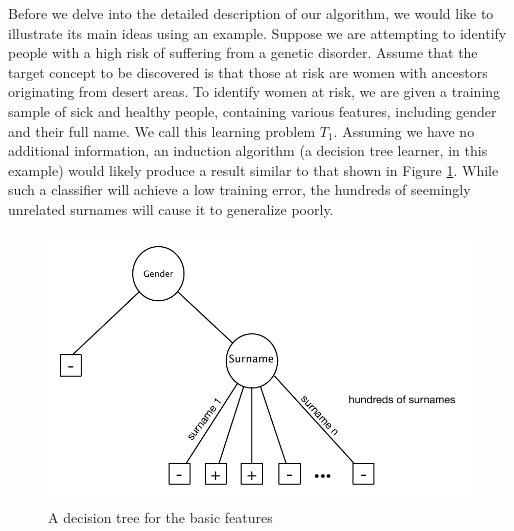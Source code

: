 \documentclass[letterpaper]{article} %
\theoremstyle{definition}
\begin{document}
Before we delve into the detailed description of our algorithm, we would like to illustrate its main ideas using an example.
Suppose we are attempting to identify people with a high risk of suffering from a genetic disorder. Assume that the target concept to be discovered is that those at risk are women with ancestors originating from desert areas. To identify women at risk, we are given a training sample of sick and healthy people, containing various features, including gender and their full name. We call this learning problem $T_1$.
Assuming we have no additional information, an induction algorithm (a decision tree learner, in this example) would likely produce a result similar to that shown in Figure \ref{fig:tree_base}. While such a classifier will achieve a low training error, the hundreds of seemingly unrelated surnames will cause it to generalize poorly. %

\begin{figure}[h]
	\centering
	\includegraphics[width=0.9\linewidth]{fig1.pdf}
	\caption{A decision tree for the basic features}
	\label{fig:tree_base}
\end{figure}
\end{document}
